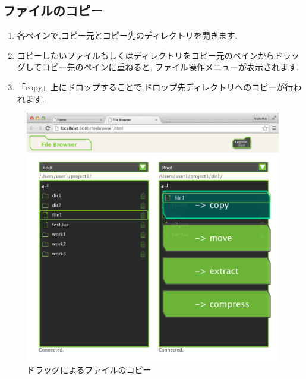 \documentclass[a4paper,10pt,oneside]{jsbook}
\begin{document}
\subsection{ファイルのコピー}
\begin{enumerate}
	\item 各ペインで,コピー元とコピー先のディレクトリを開きます.
	\item コピーしたいファイルもしくはディレクトリをコピー元のペインからドラッグしてコピー先のペインに重ねると,
		 ファイル操作メニューが表示されます.
	\item 「copy」上にドロップすることで,ドロップ先ディレクトリへのコピーが行われます.
\end{enumerate}
\begin{figure}[htbp]
	\begin{center}
		\includegraphics[width=12.0cm]{image/filebrowser_003.png}
	\end{center}
	\caption{ドラッグによるファイルのコピー}
	\label{fig:filebrowser_filecopy}
\end{figure}

\newpage
\end{document}
